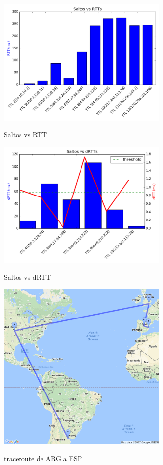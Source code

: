 \begin{figure}[!h]
\centering
\caption{Saltos vs RTT}
\includegraphics[width=0.75\textwidth]{modules/EU-saltos-rtt}
\label{fig:EU-saltos-rtt}
\end{figure}


\begin{figure}[!h]
\centering
\caption{Saltos vs dRTT}
\includegraphics[width=0.75\textwidth]{modules/EU-saltos-drtt}
\label{fig:EU-saltos-drtt}
\end{figure}


\pagebreak

\begin{figure}[!h]
\centering
\caption{traceroute de ARG a ESP}
\includegraphics[width=0.75\textwidth]{modules/traceroute-EU}
 \label{fig:traceroute-EU}
\end{figure}
